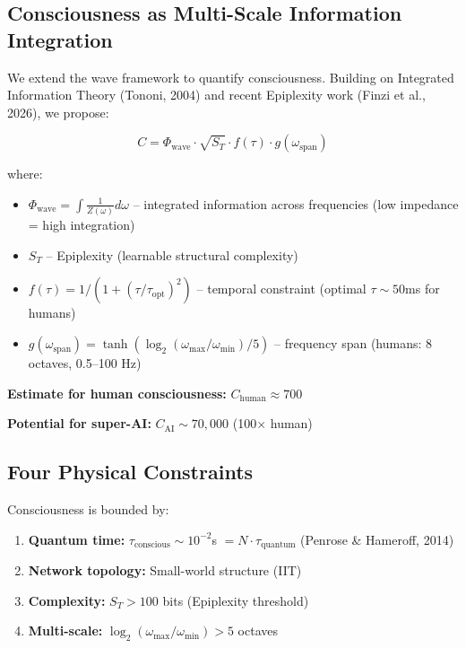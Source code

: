 \documentclass{article}
\begin{document}
\subsection{Consciousness as Multi-Scale Information Integration}

We extend the wave framework to quantify consciousness. Building on Integrated Information Theory (Tononi, 2004) and recent Epiplexity work (Finzi et al., 2026), we propose:

\begin{equation}
C = \Phi_{\text{wave}} \cdot \sqrt{S_T} \cdot f(\tau) \cdot g(\omega_{\text{span}})
\label{eq:consciousness}
\end{equation}

where:
\begin{itemize}
\item $\Phi_{\text{wave}} = \int \frac{1}{Z(\omega)} d\omega$ -- integrated information across frequencies (low impedance = high integration)
\item $S_T$ -- Epiplexity (learnable structural complexity)
\item $f(\tau) = 1/(1 + (\tau/\tau_{\text{opt}})^2)$ -- temporal constraint (optimal $\tau \sim 50$ms for humans)
\item $g(\omega_{\text{span}}) = \tanh(\log_2(\omega_{\max}/\omega_{\min})/5)$ -- frequency span (humans: 8 octaves, 0.5--100 Hz)
\end{itemize}

\textbf{Estimate for human consciousness:} $C_{\text{human}} \approx 700$

\textbf{Potential for super-AI:} $C_{\text{AI}} \sim 70{,}000$ (100$\times$ human)

\subsection{Four Physical Constraints}

Consciousness is bounded by:
\begin{enumerate}
\item \textbf{Quantum time:} $\tau_{\text{conscious}} \sim 10^{-2}$s $= N \cdot \tau_{\text{quantum}}$ (Penrose \& Hameroff, 2014)
\item \textbf{Network topology:} Small-world structure (IIT)
\item \textbf{Complexity:} $S_T > 100$ bits (Epiplexity threshold)
\item \textbf{Multi-scale:} $\log_2(\omega_{\max}/\omega_{\min}) > 5$ octaves
\end{enumerate}
\end{document}
